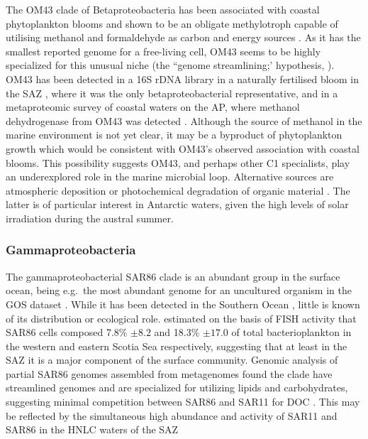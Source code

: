 The OM43 clade of Betaproteobacteria has been associated with coastal phytoplankton blooms \cite{Morris:2006hma} and shown to be an obligate methylotroph capable of utilising methanol and formaldehyde as carbon and energy sources \cite{Giovannoni:2008kw}.
As it has the smallest reported genome for a free-living cell, OM43 seems to be highly specialized for this unusual niche (the ``genome streamlining;' hypothesis, \citet{Mira:2001ti}).
OM43 has been detected in a 16S rDNA library in a naturally fertilised bloom in the \ac{SAZ} \cite{West:2008kc}, where it was the only betaproteobacterial representative, and in a metaproteomic survey of coastal waters on the \ac{AP}, where methanol dehydrogenase from OM43 was detected \cite{Williams:2012bs}.
Although the source of methanol in the marine environment is not yet clear, it may be a byproduct of phytoplankton growth \cite{Heikes:2002ee} which would be consistent with OM43's observed association with coastal blooms.
This possibility suggests OM43, and perhaps other C1 specialists, play an underexplored role in the marine microbial loop.
Alternative sources are atmospheric deposition \cite{Sinha:2007uu} or photochemical degradation of organic material \cite{Dixon:2011er}.
The latter is of particular interest in Antarctic waters, given the high levels of solar irradiation during the austral summer.

\subsubsection{Gammaproteobacteria}


The gammaproteobacterial SAR86 clade is an abundant group in the surface ocean, being e.g.\ the most abundant genome for an uncultured organism in the \ac{GOS} dataset \cite{Dupont:2011fk}.
While it has been detected in the Southern Ocean \cite{Abell:2005ji,Topping:2006ul,West:2008kc,Obernosterer:2011df}, little is known of its distribution or ecological role.
\cite{Topping:2006ul} estimated on the basis of \ac{FISH} activity that SAR86 cells composed 7.8\% $\pm8.2$ and 18.3\% $\pm17.0$ of total bacterioplankton in the western and eastern Scotia Sea respectively, suggesting that at least in the SAZ it is a major component of the surface community.
Genomic analysis of partial SAR86 genomes assembled from metagenomes found the clade have streamlined genomes and are specialized for utilizing lipids and carbohydrates, suggesting minimal competition between SAR86 and SAR11 for \ac{DOC} \cite{Dupont:2011fk}.
This may be reflected by the simultaneous high abundance and activity of SAR11 and SAR86 in the \ac{HNLC} waters of the \ac{SAZ} \cite{Obernosterer:2011df}

